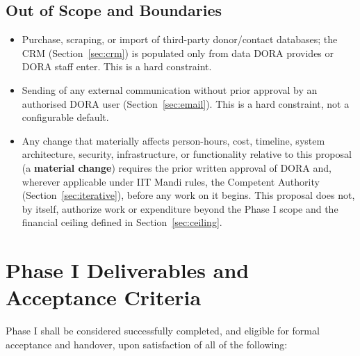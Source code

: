 \documentclass[11pt]{article}
\begin{document}
\subsection{Out of Scope and Boundaries}
\label{sec:oos}
\begin{itemize}[leftmargin=1.4em, itemsep=3pt]
\item Purchase, scraping, or import of third-party donor/contact databases; the CRM (Section~\ref{sec:crm}) is populated only from data DORA provides or DORA staff enter. This is a hard constraint.
\item Sending of any external communication without prior approval by an authorised DORA user (Section~\ref{sec:email}). This is a hard constraint, not a configurable default.
\item Any change that materially affects person-hours, cost, timeline, system architecture, security, infrastructure, or functionality relative to this proposal (a \textbf{material change}) requires the prior written approval of DORA and, wherever applicable under IIT Mandi rules, the Competent Authority (Section~\ref{sec:iterative}), before any work on it begins. This proposal does not, by itself, authorize work or expenditure beyond the Phase I scope and the financial ceiling defined in Section~\ref{sec:ceiling}.
\end{itemize}

\section{Phase I Deliverables and Acceptance Criteria}
\label{sec:deliverables}
Phase I shall be considered successfully completed, and eligible for formal acceptance and handover, upon satisfaction of all of the following:
\end{document}
